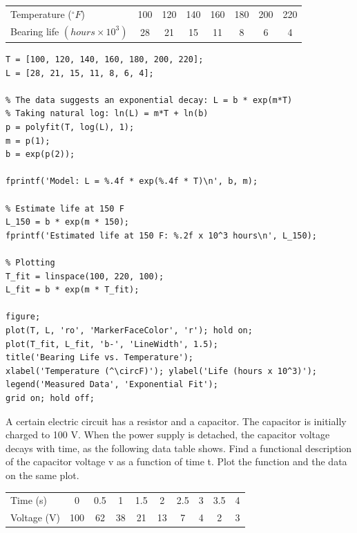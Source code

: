 \begin{table}[h]
\centering
\begin{tabular}{lccccccc}
Temperature ($^\circ F$) & 100 & 120 & 140 & 160 & 180 & 200 & 220 \\
Bearing life $(hours\times10^3)$ & 28 & 21 & 15 & 11 & 8 & 6 & 4 \\
\end{tabular}
\end{table}

\begin{lstlisting}
T = [100, 120, 140, 160, 180, 200, 220];
L = [28, 21, 15, 11, 8, 6, 4];

% The data suggests an exponential decay: L = b * exp(m*T)
% Taking natural log: ln(L) = m*T + ln(b)
p = polyfit(T, log(L), 1);
m = p(1);
b = exp(p(2));

fprintf('Model: L = %.4f * exp(%.4f * T)\n', b, m);

% Estimate life at 150 F
L_150 = b * exp(m * 150);
fprintf('Estimated life at 150 F: %.2f x 10^3 hours\n', L_150);

% Plotting
T_fit = linspace(100, 220, 100);
L_fit = b * exp(m * T_fit);

figure;
plot(T, L, 'ro', 'MarkerFaceColor', 'r'); hold on;
plot(T_fit, L_fit, 'b-', 'LineWidth', 1.5);
title('Bearing Life vs. Temperature');
xlabel('Temperature (^\circF)'); ylabel('Life (hours x 10^3)');
legend('Measured Data', 'Exponential Fit');
grid on; hold off;
\end{lstlisting}

A certain electric circuit has a resistor and a capacitor. The capacitor is initially charged to 100 V. When the power supply is detached, the capacitor voltage decays with time, as the following data table shows. Find a functional description of the capacitor voltage v as a function of time t. Plot the function and the data on the same plot.

\begin{table}[h]
\centering
\begin{tabular}{lccccccccc}
Time (s) & 0 & 0.5 & 1 & 1.5 & 2 & 2.5 & 3 & 3.5 & 4 \\
Voltage (V) & 100 & 62 & 38 & 21 & 13 & 7 & 4 & 2 & 3 \\
\end{tabular}
\end{table}

